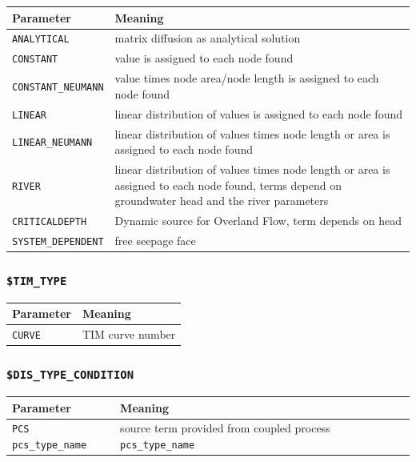 \begin{tabular*}{12.773cm}{|p{}|p{8.9cm}|} \hline
Parameter          & Meaning \\ \hline \hline
%
\texttt{ANALYTICAL}        & matrix diffusion as analytical solution \\
\texttt{CONSTANT}          & value is assigned to each node found \\
\texttt{CONSTANT\_NEUMANN} & value times node area/node length is assigned to each node found \\
\texttt{LINEAR}            & linear distribution of values is assigned to each node found \\
\texttt{LINEAR\_NEUMANN}   & linear distribution of values times node length or area is assigned to each node found  \\
\texttt{RIVER}   & linear distribution of values times node length
or area is assigned to each node found,
                   terms depend on groundwater head and the river parameters \\
\texttt{CRITICALDEPTH}   & Dynamic source for Overland Flow, term depends on head\\
\texttt{SYSTEM\_DEPENDENT}  & free seepage face \\
\hline
\end{tabular*}

\subsubsection{\texttt{\$TIM\_TYPE}}

\begin{tabular*}{12.773cm}{|p{}|p{8.9cm}|} \hline
Parameter           & Meaning \\ \hline \hline
%
\texttt{CURVE}      & TIM curve number \\
\hline
\end{tabular*}

\subsubsection{\texttt{\$DIS\_TYPE\_CONDITION}}

\begin{tabular*}{12.773cm}{|p{}|p{8.9cm}|} \hline
Parameter           & Meaning \\ \hline \hline
%
\texttt{PCS pcs\_type\_name} & source term provided from coupled process \texttt{pcs\_type\_name}\\
\hline
\end{tabular*}



